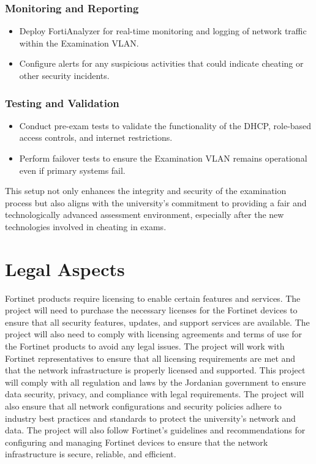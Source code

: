 \documentclass[12pt]{report}
\begin{document}
\subsubsection{Monitoring and Reporting}
\begin{itemize}
    \item Deploy FortiAnalyzer for real-time monitoring and logging of network traffic within the Examination VLAN.
    \item Configure alerts for any suspicious activities that could indicate cheating or other security incidents.
\end{itemize}

\subsubsection{Testing and Validation}
\begin{itemize}
    \item Conduct pre-exam tests to validate the functionality of the DHCP, role-based access controls, and internet restrictions.
    \item Perform failover tests to ensure the Examination VLAN remains operational even if primary systems fail.
\end{itemize}

This setup not only enhances the integrity and security of the examination process but also aligns with the university's commitment to providing a fair and technologically advanced assessment environment, especially after the new technologies involved in cheating in exams.



\section{Legal Aspects}
Fortinet products require licensing to enable certain features and services. The project will need to purchase the necessary licenses for the Fortinet devices to ensure that all security features, updates, and support services are available. The project will also need to comply with licensing agreements and terms of use for the Fortinet products to avoid any legal issues. The project will work with Fortinet representatives to ensure that all licensing requirements are met and that the network infrastructure is properly licensed and supported.
This project will comply with all regulation and laws by the Jordanian government to ensure data security, privacy, and compliance with legal requirements. The project will also ensure that all network configurations and security policies adhere to industry best practices and standards to protect the university's network and data. The project will also follow Fortinet's guidelines and recommendations for configuring and managing Fortinet devices to ensure that the network infrastructure is secure, reliable, and efficient.
\end{document}
